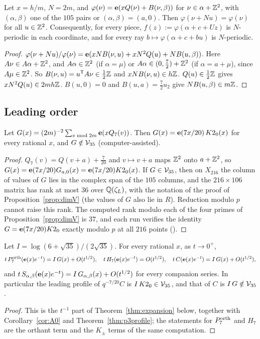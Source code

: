 \begin{lemma}[Periodicity]\label{lem:period}
Let $x=h/m$, $N=2m$, and $\varphi(\nu)=\mathbf{e}(xQ(\nu)+B(\nu,\beta))$ for $\nu\in\alpha+\mathbb{Z}^2$, with $(\alpha,\beta)$ one of the $105$ pairs or $(\alpha,\beta)=(a,0)$.
Then $\varphi(\nu+Nu)=\varphi(\nu)$ for all $u\in\mathbb{Z}^2$. Consequently, for every piece, $f(z):=\varphi(\alpha+c+Uz)$ is $N$-periodic in each coordinate,
and for every ray $b\mapsto\varphi(\alpha+c+bu)$ is $N$-periodic.
\end{lemma}
\begin{proof}
$\varphi(\nu+Nu)/\varphi(\nu)=\mathbf{e}(xNB(\nu,u)+xN^2Q(u)+NB(u,\beta))$. Here $A\nu\in A\alpha+\mathbb{Z}^2$, and $A\alpha\in\mathbb{Z}^2$ (if $\alpha=\mu$) or
$A\alpha\in(0,\tfrac72)+\mathbb{Z}^2$ (if $\alpha=a+\mu$), since $A\mu\in\mathbb{Z}^2$. So $B(\nu,u)=u^{\mathsf T}A\nu\in\tfrac12\mathbb{Z}$ and $xNB(\nu,u)\in h\mathbb{Z}$.
$Q(u)\in\tfrac12\mathbb{Z}$ gives $xN^2Q(u)\in2mh\mathbb{Z}$. $B(u,0)=0$ and $B(u,a)=\tfrac72u_2$ give $NB(u,\beta)\in m\mathbb{Z}$.
\end{proof}

\subsection{Leading order}
\begin{theorem}\label{thm:p3profile}
Let $G(x)=(2m)^{-2}\sum_{v\bmod 2m}\mathbf{e}(xQ_7(v))$. Then $G(x)=\mathbf{e}(7x/20)\,K2_0(x)$ for every rational $x$, and $G\notin\mathcal V_{35}$ (computer-assisted).
\end{theorem}
\begin{proof}
$Q_7(v)=Q(v+a)+\tfrac7{20}$ and $v\mapsto v+a$ maps $\mathbb{Z}^2$ onto $a+\mathbb{Z}^2$, so $G(x)=\mathbf{e}(7x/20)G_{a,0}(x)=\mathbf{e}(7x/20)K2_0(x)$.
If $G\in\mathcal V_{35}$, then on $X_{216}$ the column of values of $G$ lies in the complex span of the $105$ columns, and the $216\times106$ matrix has rank at most
$36$ over $\mathbb{Q}(\zeta_L)$, with the notation of the proof of Proposition~\ref{prop:dimV} (the values of $G$ also lie in $R$). Reduction modulo $p$
cannot raise this rank. The computed rank modulo each of the four primes of Proposition~\ref{prop:dimV} is $37$, and each run verifies the identity
$G=\mathbf{e}(7x/20)K2_0$ exactly modulo $p$ at all $216$ points ().
\end{proof}

\begin{theorem}\label{thm:lead}
Let $I=\log(6+\sqrt{35})/(2\sqrt{35})$. For every rational $x$, as $t\to0^+$,
\[
t\,P^{\mathrm{orth}}_7(\mathbf{e}(x)e^{-t})=I\,G(x)+O(t^{1/2}),\quad t\,H_7(\mathbf{e}(x)e^{-t})=O(t^{1/2}),\quad t\,C(\mathbf{e}(x)e^{-t})=I\,G(x)+O(t^{1/2}),
\]
and $t\,S_{\alpha,\beta}(\mathbf{e}(x)e^{-t})=I\,G_{\alpha,\beta}(x)+O(t^{1/2})$ for every companion series. In particular the leading profile of
$q^{-7/20}C$ is $I\,K2_0\in\mathcal V_{35}$, and that of $C$ is $I\,G\notin\mathcal V_{35}$.
\end{theorem}
\begin{proof}
This is the $t^{-1}$ part of Theorem~\ref{thm:expansion} below, together with Corollary~\ref{cor:A0} and Theorem~\ref{thm:p3profile}; the
statements for $P^{\mathrm{orth}}_7$ and $H_7$ are the orthant term and the $K_\pm$ terms of the same computation.
\end{proof}

